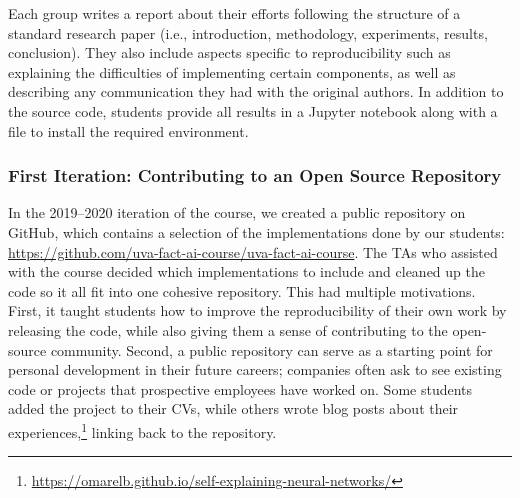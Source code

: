 Each group writes a report about their efforts following the structure of a standard research paper (i.e., introduction, methodology, experiments, results, conclusion). 
They also include aspects specific to reproducibility such as explaining the difficulties of implementing certain components, as well as describing any communication they had with the original authors.
In addition to the source code, students provide all results in a Jupyter notebook along with a file to install the required environment. 

\subsubsection{First Iteration: Contributing to an Open Source Repository}
In the 2019--2020 iteration of the course, we created a public repository on GitHub, which contains a selection of the implementations done by our students: \url{https://github.com/uva-fact-ai-course/uva-fact-ai-course}. 
The TAs who assisted with the course decided which implementations to include and cleaned up the code so it all fit into one cohesive repository. 
This had multiple motivations.
First, it taught students how to improve the reproducibility of their own work by releasing the code, while also giving them a sense of contributing to the open-source community. 
Second, a public repository can serve as a starting point for personal development in their future careers; companies often ask to see existing code or projects that prospective employees have worked on. 
Some students added the project to their CVs, while others wrote blog posts about their experiences,\footnote{\url{https://omarelb.github.io/self-explaining-neural-networks/}}  linking back to the repository.


